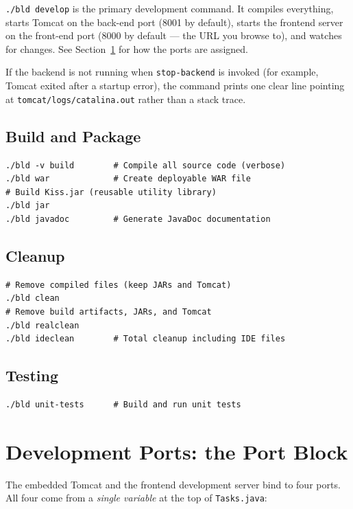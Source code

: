 \noindent
\texttt{./bld develop} is the primary development command.  It compiles everything, starts Tomcat on the back-end port (8001 by default), starts the frontend server on the front-end port (8000 by default --- the URL you browse to), and watches for changes.  See Section~\ref{sec:build-ports} for how the ports are assigned.

If the backend is not running when \texttt{stop-backend} is invoked (for example, Tomcat exited after a startup error), the command prints one clear line pointing at \texttt{tomcat/logs/catalina.out} rather than a stack trace.

\subsection{Build and Package}

\begin{lstlisting}[style=shell]
./bld -v build        # Compile all source code (verbose)
./bld war             # Create deployable WAR file
# Build Kiss.jar (reusable utility library)
./bld jar
./bld javadoc         # Generate JavaDoc documentation
\end{lstlisting}

\subsection{Cleanup}

\begin{lstlisting}[style=shell]
# Remove compiled files (keep JARs and Tomcat)
./bld clean
# Remove build artifacts, JARs, and Tomcat
./bld realclean
./bld ideclean        # Total cleanup including IDE files
\end{lstlisting}

\subsection{Testing}

\begin{lstlisting}[style=shell]
./bld unit-tests      # Build and run unit tests
\end{lstlisting}

\section{Development Ports: the Port Block}
\label{sec:build-ports}

The embedded Tomcat and the frontend development server bind to four ports.  All four come from a \emph{single variable} at the top of \texttt{Tasks.java}:

